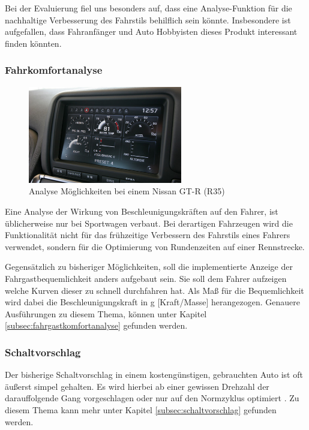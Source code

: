 Bei der Evaluierung fiel uns besonders auf, dass eine Analyse-Funktion für die nachhaltige Verbesserung des Fahrstils behilflich sein könnte. Insbesondere ist aufgefallen, dass Fahranfänger und Auto Hobbyisten dieses Produkt interessant finden könnten.

\subsubsection{Fahrkomfortanalyse}
\begin{figure}\centering
	\includegraphics[width=0.6\textwidth]{images/gtrMultifunc}
	\caption{Analyse Möglichkeiten bei einem Nissan GT-R (R35) \cite{SIMR.CH1-Fahrstil-Analyse.GTRMultifunc}}\label{Fig:imgGTR}
\end{figure}
Eine Analyse der Wirkung von Beschleunigungskräften auf den Fahrer, ist üblicherweise nur bei Sportwagen verbaut. Bei derartigen Fahrzeugen wird die Funktionalität nicht für das frühzeitige Verbessern des Fahrstils eines Fahrers verwendet, sondern für die Optimierung von Rundenzeiten auf einer Rennstrecke.

Gegensätzlich zu bisheriger Möglichkeiten, soll die implementierte Anzeige der Fahrgastbequemlichkeit anders aufgebaut sein.
Sie soll dem Fahrer aufzeigen welche Kurven dieser zu schnell durchfahren hat. Als Maß für die Bequemlichkeit wird dabei die Beschleunigungskraft in g [Kraft/Masse] herangezogen. Genauere Ausführungen zu diesem Thema, können unter Kapitel \ref{subsec:fahrgastkomfortanalyse} gefunden werden.

\subsubsection{Schaltvorschlag}
Der bisherige Schaltvorschlag in einem kostengünstigen, gebrauchten Auto ist oft äußerst simpel gehalten. Es wird hierbei ab einer gewissen Drehzahl der darauffolgende Gang vorgeschlagen oder nur auf den Normzyklus optimiert \cite{SIMR.CH1-Fahrstil-Analyse.Schaltempfehlung}. Zu diesem Thema kann mehr unter Kapitel \ref{subsec:schaltvorschlag} gefunden werden.
